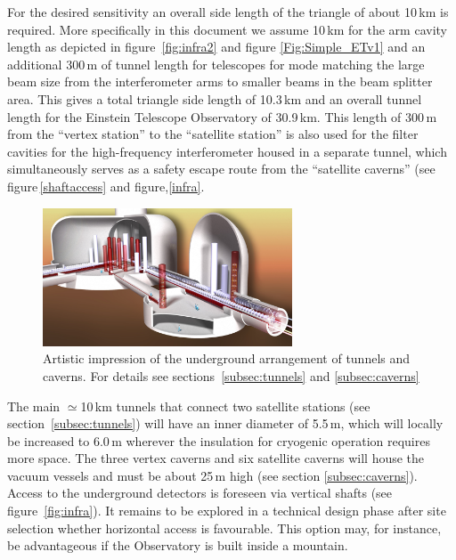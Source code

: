 For the desired sensitivity an overall side length of the triangle of about 10\,km is required. More specifically in this document we assume 10\,km for the arm cavity length as depicted in figure~\ref{fig:infra2} and figure \ref{Fig:Simple_ETv1} and an additional 300\,m of tunnel length for telescopes for mode matching the large beam size from the interferometer arms to smaller beams in the beam splitter area. 
This gives a total triangle side length of 10.3\,km and an overall tunnel length for the Einstein Telescope Observatory of 30.9\,km. This length of 300\,m from the ``vertex station'' to the ``satellite station'' is also used for the filter cavities for the high-frequency interferometer housed in a separate tunnel, which simultaneously serves as a safety escape route from the ``satellite caverns'' (see figure\,\ref{shaftaccess} and figure,\ref{infra}.  

\begin{figure}
	\centering
\vskip 0.1cm
		\includegraphics[width=0.66\textwidth]{Intro/Intro_Figures/ArtisticView1.jpg}
	\caption{Artistic impression of the underground arrangement of tunnels and 
	caverns. For details see sections~\ref{subsec:tunnels} and \ref{subsec:caverns}}
	\label{fig:Artisticview1}
\end{figure}
The main $\simeq$10\,km tunnels that \mbox{connect} two satellite stations (see section~\ref{subsec:tunnels}) will have an inner diameter of 5.5\,m, which will \mbox{locally} be increased to 6.0\,m wherever the insulation for \mbox{cryogenic} operation requires more space. The three {\mbox vertex} caverns and six satellite caverns will house the vacuum \mbox{vessels} and must be about 25\,m high (see section \ref{subsec:caverns}). 
Access to the \mbox{underground} detectors is foreseen via vertical shafts (see figure~\ref{fig:infra}). It remains to be explored in a technical design phase after site selection whether horizontal access is favourable. This option may, for instance, be advantageous if the \mbox{Observatory} is built inside a mountain. 

